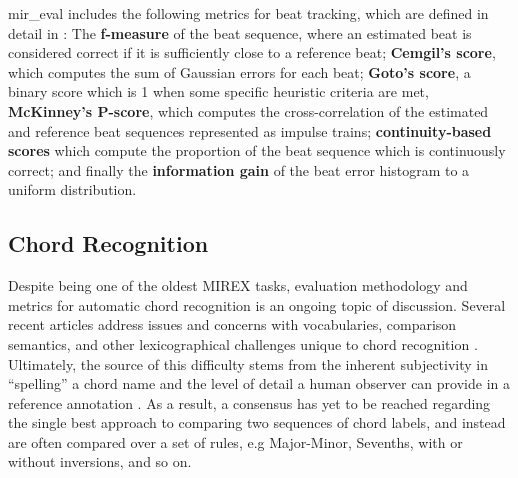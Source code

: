 \documentclass{article}
\begin{document}
mir\_eval includes the following metrics for beat tracking, which are defined in detail in \cite{davies2009evaluation}: The \textbf{f-measure} of the beat sequence, where an estimated beat is considered correct if it is sufficiently close to a reference beat; \textbf{Cemgil's score}, which computes the sum of Gaussian errors for each beat; \textbf{Goto's score}, a binary score which is 1 when some specific heuristic criteria are met, \textbf{McKinney's P-score}, which computes the cross-correlation of the estimated and reference beat sequences represented as impulse trains; \textbf{continuity-based scores} which compute the proportion of the beat sequence which is continuously correct; and finally the \textbf{information gain} of the beat error histogram to a uniform distribution.

\subsection{Chord Recognition}


Despite being one of the oldest MIREX tasks, evaluation methodology and metrics for automatic chord recognition is an ongoing topic of discussion.
Several recent articles address issues and concerns with vocabularies, comparison semantics, and other lexicographical challenges unique to chord recognition \cite{}.
Ultimately, the source of this difficulty stems from the inherent subjectivity in ``spelling'' a chord name and the level of detail a human observer can provide in a reference annotation \cite{McVicar}.
As a result, a consensus has yet to be reached regarding the single best approach to comparing two sequences of chord labels, and instead are often compared over a set of rules, e.g Major-Minor, Sevenths, with or without inversions, and so on.
\end{document}
